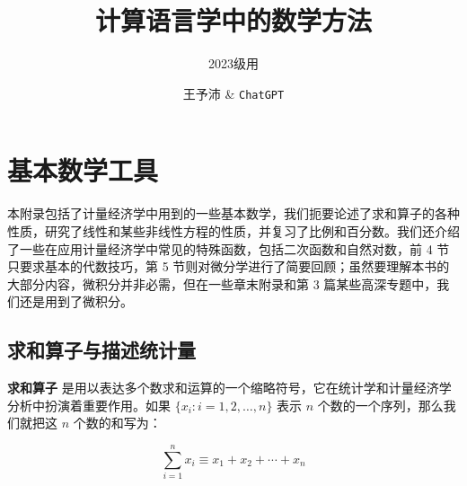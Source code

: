 \documentclass[lang=cn,newtx,10pt,scheme=chinese]{elegantbook}
\title{计算语言学中的数学方法}
\subtitle{2023级用}
\author{王予沛 \& \texttt{ChatGPT}}
\institute{北京师范大学中文信息处理研究所}
\begin{document}
\maketitle
\frontmatter

\tableofcontents

\mainmatter








\printbibliography[heading=bibintoc, title=\ebibname]
\appendix

\chapter{基本数学工具}


本附录包括了计量经济学中用到的一些基本数学，我们扼要论述了求和算子的各种性质，研究了线性和某些非线性方程的性质，并复习了比例和百分数。我们还介绍了一些在应用计量经济学中常见的特殊函数，包括二次函数和自然对数，前 4 节只要求基本的代数技巧，第 5 节则对微分学进行了简要回顾；虽然要理解本书的大部分内容，微积分并非必需，但在一些章末附录和第 3 篇某些高深专题中，我们还是用到了微积分。

\section{求和算子与描述统计量}

\textbf{求和算子} 是用以表达多个数求和运算的一个缩略符号，它在统计学和计量经济学分析中扮演着重要作用。如果 $\{x_i: i=1, 2, \ldots, n\}$ 表示 $n$ 个数的一个序列，那么我们就把这 $n$ 个数的和写为：

\begin{equation}
\sum_{i=1}^n x_i \equiv x_1 + x_2 +\cdots + x_n
\end{equation}
\end{document}
